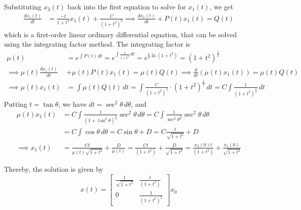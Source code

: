 Substituting \( x_2(t) \) back into the first equation to solve for \( x_1(t) \), we get
\begin{align*}
    \frac{d x_1(t)}{dt}
     & =
    \frac{-t}{1+t^2} x_1(t) + \frac{C}{{(1+t^2)}^2}
    \implies
    \frac{d x_1(t)}{dt}
    +
    P(t) x_1(t)
    =
    Q(t)
\end{align*}
which is a first-order linear ordinary differential equation, that can be solved using the integrating factor method.
The integrating factor is
\begin{align*}
    \mu(t)
     & =
    e^{\int P(t) \, dt}
    =
    e^{\int \frac{t}{1+t^2} \, dt}
    =
    e^{\frac{1}{2} \ln(1+t^2)}
        =
        {(1+t^2)}^{\frac{1}{2}}
    \\
    \implies
    \mu(t) \frac{d x_1(t)}{dt}
     & +
    \mu(t) P(t) x_1(t)
    =
    \mu(t) Q(t)
    \implies
    \frac{d}{dt} \left( \mu(t) x_1(t) \right)
    =
    \mu(t) Q(t)
    \\
    \implies
    \mu(t) x_1(t)
     & =
    \int \mu(t) Q(t) \, dt
    =
    \int \frac{C}{{(1+t^2)}^2} \cdot {(1+t^2)}^{\frac{1}{2}} \, dt
    =
    C \int \frac{1}{{(1+t^2)}^{\frac{3}{2}}} \, dt
\end{align*}
Putting \( t = \tan \theta \), we have \( dt = \sec^2 \theta \, d\theta \), and
\begin{align*}
    \mu(t) x_1(t)
     & =
    C \int \frac{1}{{(1+\tan^2 \theta)}^{\frac{3}{2}}} \sec^2 \theta \, d\theta
    =
    C \int \frac{1}{{\sec^2 \theta}^{\frac{3}{2}}} \sec^2 \theta \, d\theta
    \\ & =
    C \int \cos \theta \, d\theta
    =
    C \sin \theta + D
    =
    C \frac{t}{\sqrt{1+t^2}} + D
    \\
    \implies
    x_1(t)
     & =
    \frac{C t}{\mu(t) \sqrt{1+t^2}} + \frac{D}{\mu(t)}
    =
    \frac{C t}{(1+t^2)} + \frac{D}{\sqrt{1+t^2}}
    =
    \frac{x_2(0) t}{(1+t^2)} + \frac{x_1(0)}{\sqrt{1+t^2}}
\end{align*}

Thereby, the solution is given by
\begin{equation*}
    \boxed{
        x(t)
        =
        \begin{bmatrix}
            \frac{1}{\sqrt{1+t^2}}
             & \frac{t}{(1+t^2)}
            \\
            0
             & \frac{1}{{(1+t^2)}^2}
        \end{bmatrix}
        x_0
    }
\end{equation*}

